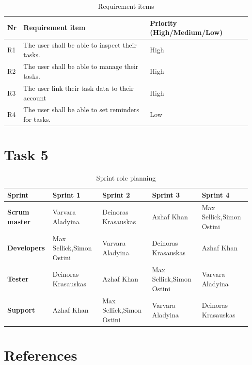 \documentclass{article}
\begin{document}
\begin{table}[h]
  \centering
  \begin{tabularx}{\textwidth}{l|X|l}
    \toprule
    \textbf{Nr} & \textbf{Requirement item}                          & \textbf{Priority (High/Medium/Low)} \\
    \hline\hline
    R1          & The user shall be able to inspect their tasks.     & High                                \\
    \hline
    R2          & The user shall be able to manage their tasks.      & High                                \\
    \hline
    R3          & The user link their task data to their account     & High                                \\
    \hline
    R4          & The user shall be able to set reminders for tasks. & Low                                 \\
    \bottomrule
  \end{tabularx}
  \caption{Requirement items}
  \label{Requirement items}
\end{table}

\clearpage

\section{Task 5}

\begin{table}[h]
  \centering
  \begin{tabularx}{\textwidth}{l|X|X|X|X}
    \toprule
    \textbf{Sprint}       & Sprint 1                          & Sprint 2                          & Sprint 3                          & Sprint 4                          \\
    \hline\hline
    \textbf{Scrum master} & Varvara Aladyina                  & Deinoras Krasauskas               & Azhaf Khan                        & Max Sellick,\newline Simon Ostini \\
    \hline
    \textbf{Developers}   & Max Sellick,\newline Simon Ostini & Varvara Aladyina                  & Deinoras Krasauskas               & Azhaf Khan                        \\
    \hline
    \textbf{Tester}       & Deinoras Krasauskas               & Azhaf Khan                        & Max Sellick,\newline Simon Ostini & Varvara Aladyina                  \\
    \hline
    \textbf{Support}      & Azhaf Khan                        & Max Sellick,\newline Simon Ostini & Varvara Aladyina                  & Deinoras Krasauskas               \\
    \bottomrule
  \end{tabularx}
  \caption{Sprint role planning}
  \label{Sprint role planning}
\end{table}

\clearpage

\section{References}
\printbibliography[heading=none]
\end{document}
